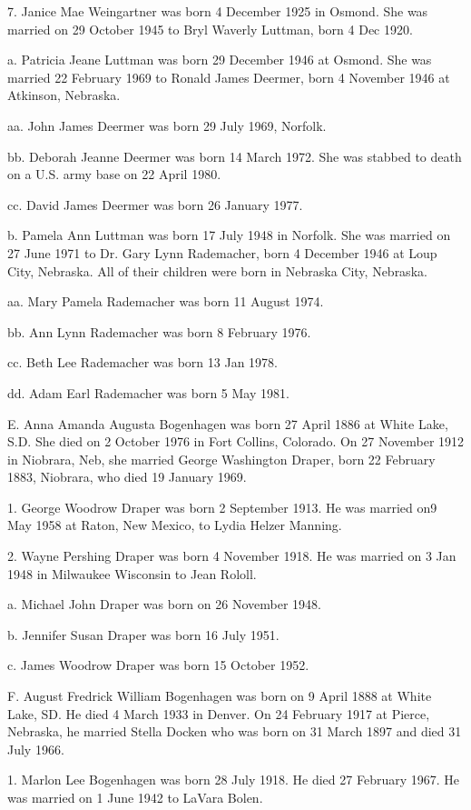 \documentclass[a4paper]{article}
\begin{document}
7. Janice Mae Weingartner was born 4 December 1925 in Osmond.  She was married on 29 October 1945 to Bryl Waverly Luttman, born 4 Dec 1920.
 
a. Patricia Jeane Luttman was born 29 December 1946 at Osmond. She was married 22 February 1969 to Ronald James Deermer, born 4 November 1946 at Atkinson, Nebraska.
 
aa. John James Deermer was born 29 July 1969, Norfolk.

bb. Deborah Jeanne Deermer was born 14 March 1972.  She was stabbed to death on a U.S. army base on 22 April 1980.

cc. David James Deermer was born 26 January 1977.

b. Pamela Ann Luttman was born 17 July 1948 in Norfolk.  She was married on 27 June 1971 to Dr. Gary Lynn Rademacher, born 4 December 1946 at Loup City, Nebraska. All of their children were born in Nebraska City, Nebraska.

aa. Mary Pamela Rademacher was born 11 August 1974.

bb. Ann Lynn Rademacher was born 8 February 1976.

cc. Beth Lee Rademacher was born 13 Jan 1978.

dd. Adam Earl Rademacher was born 5 May 1981.

E. Anna Amanda Augusta Bogenhagen was born 27 April 1886 at White Lake, S.D.  She died on 2 October 1976 in Fort Collins, Colorado.  On 27 November 1912 in Niobrara, Neb, she married George Washington Draper, born 22 February 1883, Niobrara, who died 19 January 1969.

1. George Woodrow Draper was born 2 September 1913.  He was married on9 May 1958 at Raton, New Mexico, to Lydia Helzer Manning.

2. Wayne Pershing Draper was born 4 November 1918.  He was married on 3 Jan 1948 in Milwaukee Wisconsin to Jean Rololl.
 
a. Michael John Draper was born on 26 November 1948.

b. Jennifer Susan Draper was born 16 July 1951.

c. James Woodrow Draper was born 15 October 1952.

F. August Fredrick William Bogenhagen was born on 9 April 1888 at White Lake, SD. He died 4 March 1933 in Denver.  On 24 February 1917 at Pierce, Nebraska, he married Stella Docken who was born on 31 March 1897 and died 31 July 1966.

1. Marlon Lee Bogenhagen was born 28 July 1918.  He died 27 February 1967. He was married on 1 June 1942 to LaVara Bolen.
 
\end{document}
